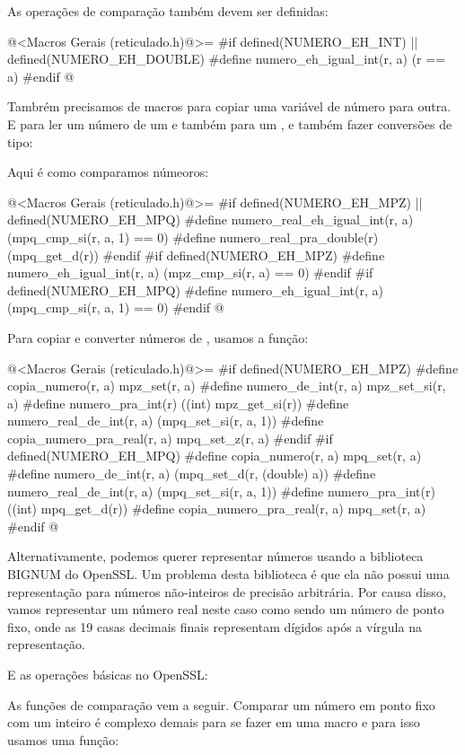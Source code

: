 

As operações de comparação também devem ser definidas:

\iniciocodigo
@<Macros Gerais (reticulado.h)@>=
#if defined(NUMERO_EH_INT) || defined(NUMERO_EH_DOUBLE)
#define numero_eh_igual_int(r, a) (r == a)
#endif
@
\fimcodigo


Tambrém precisamos de macros para copiar uma variável de número para
outra. E para ler um número de um  e também para
um , e também fazer conversões de tipo:






Aqui é como comparamos númeoros:

\iniciocodigo
@<Macros Gerais (reticulado.h)@>=
#if defined(NUMERO_EH_MPZ) || defined(NUMERO_EH_MPQ)
#define numero_real_eh_igual_int(r, a) (mpq_cmp_si(r, a, 1) == 0)
#define numero_real_pra_double(r) (mpq_get_d(r))
#endif
#if defined(NUMERO_EH_MPZ)
#define numero_eh_igual_int(r, a) (mpz_cmp_si(r, a) == 0)
#endif
#if defined(NUMERO_EH_MPQ)
#define numero_eh_igual_int(r, a) (mpq_cmp_si(r, a, 1) == 0)
#endif
@
\fimcodigo


Para copiar e converter números de , usamos a função:

\iniciocodigo
@<Macros Gerais (reticulado.h)@>=
#if defined(NUMERO_EH_MPZ)
#define copia_numero(r, a) mpz_set(r, a)
#define numero_de_int(r, a) mpz_set_si(r, a)
#define numero_pra_int(r) ((int) mpz_get_si(r))
#define numero_real_de_int(r, a) (mpq_set_si(r, a, 1))
#define copia_numero_pra_real(r, a) mpq_set_z(r, a)
#endif
#if defined(NUMERO_EH_MPQ)
#define copia_numero(r, a) mpq_set(r, a)
#define numero_de_int(r, a) (mpq_set_d(r, (double) a))
#define numero_real_de_int(r, a) (mpq_set_si(r, a, 1))
#define numero_pra_int(r) ((int) mpq_get_d(r))
#define copia_numero_pra_real(r, a) mpq_set(r, a)
#endif
@
\fimcodigo


Alternativamente, podemos querer representar números usando a
biblioteca BIGNUM do OpenSSL. Um problema desta biblioteca é que ela
não possui uma representação para números não-inteiros de precisão
arbitrária. Por causa disso, vamos representar um número real neste
caso como sendo um número de ponto fixo, onde as 19 casas decimais
finais representam dígidos após a vírgula na representação.



E as operações básicas no OpenSSL:


As funções de comparação vem a seguir. Comparar um número em ponto
fixo com um inteiro é complexo demais para se fazer em uma macro e
para isso usamos uma função:

